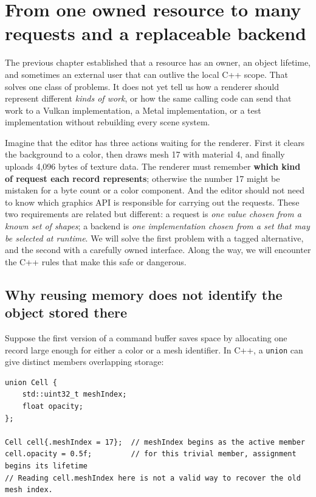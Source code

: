 \section{From one owned resource to many requests and a replaceable backend}\label{01-foundations-i-ch004-from-one-owned-resource-to-many-requests-and-a-replaceable-backend}

The previous chapter established that a resource has an owner, an object lifetime, and sometimes an external user that can outlive the local C++ scope. That solves one class of problems. It does not yet tell us how a renderer should represent different \emph{kinds of work}, or how the same calling code can send that work to a Vulkan implementation, a Metal implementation, or a test implementation without rebuilding every scene system.

Imagine that the editor has three actions waiting for the renderer. First it clears the background to a color, then draws mesh 17 with material 4, and finally uploads 4,096 bytes of texture data. The renderer must remember \textbf{which kind of request each record represents}; otherwise the number 17 might be mistaken for a byte count or a color component. And the editor should not need to know which graphics API is responsible for carrying out the requests. These two requirements are related but different: a request is \emph{one value chosen from a known set of shapes}; a backend is \emph{one implementation chosen from a set that may be selected at runtime}. We will solve the first problem with a tagged alternative, and the second with a carefully owned interface. Along the way, we will encounter the C++ rules that make this safe or dangerous.

\subsection{Why reusing memory does not identify the object stored there}\label{01-foundations-i-ch004-why-reusing-memory-does-not-identify-the-object-stored-there}

Suppose the first version of a command buffer saves space by allocating one record large enough for either a color or a mesh identifier. In C++, a \texttt{union} can give distinct members overlapping storage:

\begin{verbatim}
union Cell {
    std::uint32_t meshIndex;
    float opacity;
};

Cell cell{.meshIndex = 17};  // meshIndex begins as the active member
cell.opacity = 0.5f;         // for this trivial member, assignment begins its lifetime
// Reading cell.meshIndex here is not a valid way to recover the old mesh index.
\end{verbatim}

